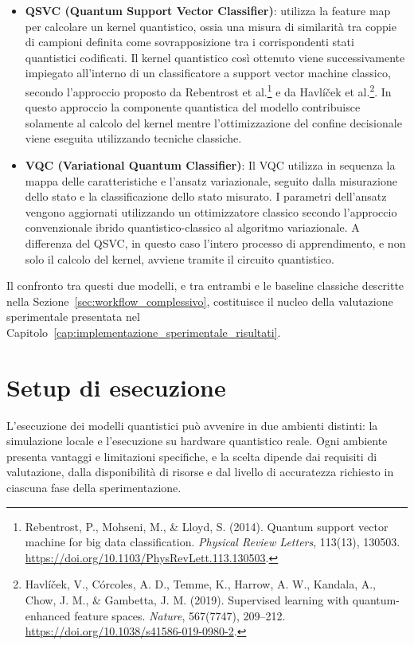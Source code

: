 \begin{itemize}
    \item \textbf{QSVC (Quantum Support Vector Classifier)}: utilizza la feature map per calcolare un kernel quantistico, ossia una misura di similarità tra coppie di campioni definita come sovrapposizione tra i corrispondenti stati quantistici codificati. Il kernel quantistico così ottenuto viene successivamente impiegato all'interno di un classificatore a support vector machine classico, secondo l'approccio proposto da Rebentrost et al.\footnote{Rebentrost, P., Mohseni, M., \& Lloyd, S. (2014). Quantum support vector machine for big data classification. \textit{Physical Review Letters}, 113(13), 130503. \url{https://doi.org/10.1103/PhysRevLett.113.130503}.} e da Havlíček et al.\footnote{Havlíček, V., Córcoles, A. D., Temme, K., Harrow, A. W., Kandala, A., Chow, J. M., \& Gambetta, J. M. (2019). Supervised learning with quantum-enhanced feature spaces. \textit{Nature}, 567(7747), 209--212. \url{https://doi.org/10.1038/s41586-019-0980-2}.}.
    In questo approccio la componente quantistica del modello contribuisce solamente al calcolo del kernel mentre l'ottimizzazione del confine decisionale viene eseguita utilizzando tecniche classiche.
    \item \textbf{VQC (Variational Quantum Classifier)}: Il VQC utilizza in sequenza la mappa delle caratteristiche e l'ansatz variazionale, seguito dalla misurazione dello stato e la classificazione dello stato misurato. I parametri dell'ansatz vengono aggiornati utilizzando un ottimizzatore classico secondo l'approccio convenzionale ibrido quantistico-classico al algoritmo variazionale.
    A differenza del QSVC, in questo caso l'intero processo di apprendimento, e non solo il calcolo del kernel, avviene tramite il circuito quantistico.
\end{itemize}

Il confronto tra questi due modelli, e tra entrambi e le baseline classiche descritte nella Sezione~\ref{sec:workflow_complessivo}, costituisce il nucleo della valutazione sperimentale presentata nel Capitolo~\ref{cap:implementazione_sperimentale_risultati}.

\section{Setup di esecuzione}
\label{sec:setup_esecuzione}

L'esecuzione dei modelli quantistici può avvenire in due ambienti distinti: la simulazione locale e l'esecuzione su hardware quantistico reale. Ogni ambiente presenta vantaggi e limitazioni specifiche, e la scelta dipende dai requisiti di valutazione, dalla disponibilità di risorse e dal livello di accuratezza richiesto in ciascuna fase della sperimentazione.

